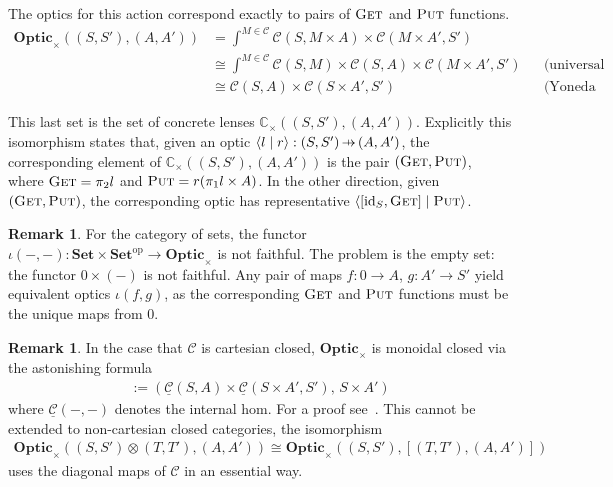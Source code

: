 \documentclass[11pt,a4paper]{article}
\theoremstyle{plain}
\theoremstyle{definition}
\newtheorem{remark}[theorem]{Remark}
\newcommand{\C}{\mathscr{C}}
\newcommand{\homC}{\underline{\C}}
\newcommand{\Set}{\mathbf{Set}}
\newcommand{\Optic}{\mathbf{Optic}}
\newcommand{\conc}{\mathbb{C}}
\newcommand{\id}{\mathrm{id}}
\newcommand{\op}{\mathrm{op}}
\newcommand{\rep}[2]{{\ensuremath \left\langle #1 \mid #2 \right\rangle}}
\newcommand{\fget}{\textsc{Get}}
\newcommand{\fput}{\textsc{Put}}
\newcommand{\hto}{\ensuremath{\,\mathaccent\shortmid\rightarrow\,}}
\begin{document}
The optics for this action correspond exactly to pairs of $\fget$ and $\fput$ functions.
\begin{align*}
  \Optic_\times((S, S'), (A, A')) &= \int^{M \in \C} \C(S, M \times A) \times \C(M \times A', S') \\
                                  &\cong \int^{M \in \C} \C(S, M) \times \C(S, A) \times \C(M \times A', S') && \text{(universal property of product)} \\
                                  &\cong \C(S, A) \times \C(S \times A', S') && \text{(Yoneda reduction)}
\end{align*}

This last set is the set of concrete lenses $\conc_\times((S, S'), (A, A'))$. Explicitly this isomorphism states that, given an optic $\rep{l}{r } : (S, S') \hto (A, A')$, the corresponding element of $\conc_\times((S, S'), (A, A'))$ is the pair $(\fget, \fput)$, where $\fget = \pi_2 l$ and $\fput = r (\pi_1 l \times A)$. In the other direction, given $(\fget, \fput)$, the corresponding optic has representative $\rep{[\id_S, \fget]}{\fput}$.

\begin{remark}\label{lens-iota-not-faithful}
  For the category of sets, the functor $\iota(-, -) : \Set \times \Set^\op \to \Optic_\times$ is not faithful. The problem is the empty set: the functor $0 \times (-)$ is not faithful. Any pair of maps $f : 0 \to A$, $g : A' \to S'$ yield equivalent optics $\iota(f, g)$, as the corresponding $\fget$ and $\fput$ functions must be the unique maps from $0$.
\end{remark}

\begin{remark}
  In the case that $\C$ is cartesian closed, $\Optic_\times$ is monoidal closed via the astonishing formula
  \begin{align*}
    [(S, S'), (A, A')] := (\homC(S, A) \times \homC(S \times A', S'), \, S \times A')
  \end{align*}
  where $\homC(-, -)$ denotes the internal hom. For a proof see~\cite[Section 1.2]{DialecticaCategories}. This cannot be extended to non-cartesian closed categories, the isomorphism
  \begin{align*}
    \Optic_\times((S, S') \otimes (T, T'), (A, A')) \cong \Optic_\times((S, S'),  [(T, T'), (A, A')])
  \end{align*}
  uses the diagonal maps of $\C$ in an essential way.
\end{remark}
\end{document}
